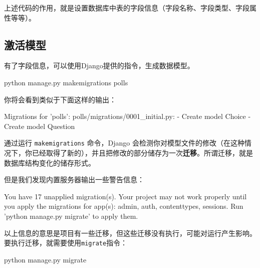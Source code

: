 \documentclass[]{ctexbook}
\newenvironment{Shaded}{\begin{snugshade}}{\end{snugshade}}
\newcommand{\BuiltInTok}[1]{#1}
\newcommand{\ExtensionTok}[1]{#1}
\newcommand{\NormalTok}[1]{#1}
\newcommand{\StringTok}[1]{\textcolor[rgb]{0.31,0.60,0.02}{#1}}
\begin{document}
上述代码的作用，就是设置数据库中表的字段信息（字段名称、字段类型、字段属性等等）。

\hypertarget{ux6fc0ux6d3bux6a21ux578b}{%
\subsection{激活模型}\label{ux6fc0ux6d3bux6a21ux578b}}

有了字段信息，可以使用Django提供的指令，生成数据模型。

\begin{Shaded}
\begin{Highlighting}[]
\ExtensionTok{python}\NormalTok{ manage.py makemigrations polls}
\end{Highlighting}
\end{Shaded}

你将会看到类似于下面这样的输出：

\begin{Shaded}
\begin{Highlighting}[]
\ExtensionTok{Migrations}\NormalTok{ for }\StringTok{'polls'}\NormalTok{:}
  \ExtensionTok{polls/migrations}\NormalTok{/0001_initial.py:}
    \ExtensionTok{-}\NormalTok{ Create model Choice}
    \ExtensionTok{-}\NormalTok{ Create model Question}
\end{Highlighting}
\end{Shaded}

通过运行 \texttt{makemigrations} 命令，Django 会检测你对模型文件的修改（在这种情况下，你已经取得了新的），并且把修改的部分储存为一次\textbf{迁移}。所谓迁移，就是数据库结构变化的储存形式。

但是我们发现内置服务器输出一些警告信息：

\begin{Shaded}
\begin{Highlighting}[]
\ExtensionTok{You}\NormalTok{ have 17 unapplied migration(s)}\BuiltInTok{.} \ExtensionTok{Your}\NormalTok{ project may not work properly until you apply the migrations for app(s)}\BuiltInTok{:}\NormalTok{ admin, auth, contenttypes, sessions.}
\ExtensionTok{Run} \StringTok{'python manage.py migrate'}\NormalTok{ to apply them.}
\end{Highlighting}
\end{Shaded}

以上信息的意思是项目有一些迁移，但这些迁移没有执行，可能对运行产生影响。要执行迁移，就需要使用\texttt{migrate}指令：

\begin{Shaded}
\begin{Highlighting}[]
\ExtensionTok{python}\NormalTok{ manage.py migrate}
\end{Highlighting}
\end{Shaded}
\end{document}
